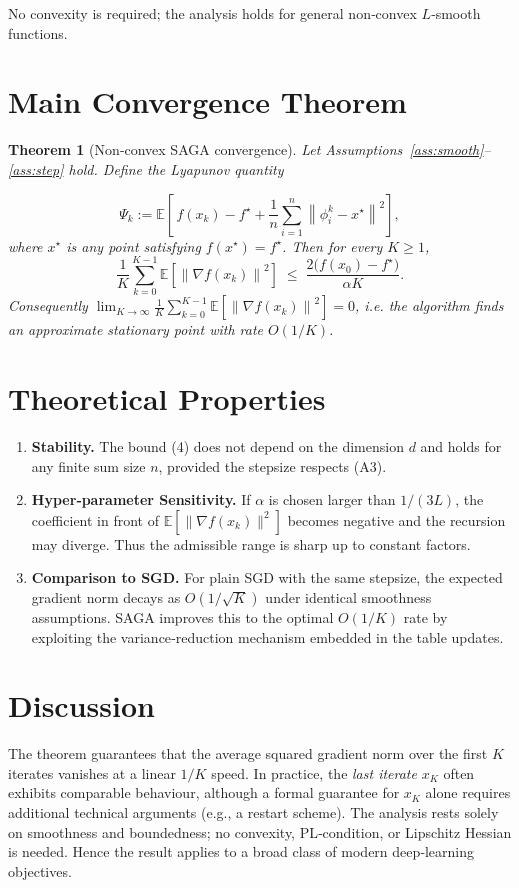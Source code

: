 \documentclass{article}
\newtheorem{theorem}{Theorem}
\newcommand{\E}{\mathbb{E}}
\newcommand{\norm}[1]{\left\|#1\right\|}
\begin{document}
No convexity is required; the analysis holds for general non‑convex $L$‑smooth
functions.

\section*{Main Convergence Theorem}
\begin{theorem}[Non‑convex SAGA convergence]\label{thm:main}
Let Assumptions~\ref{ass:smooth}–\ref{ass:step} hold.
Define the Lyapunov quantity  

\[
\Psi_k:=\E\!\left[\,f(x_k)-f^{\star}
      +\frac{1}{n}\sum_{i=1}^{n}\norm{\phi_i^{k}-x^{\star}}^{2}\right],
\]
where $x^{\star}$ is any point satisfying $f(x^{\star})=f^{\star}$.
Then for every $K\ge1$,
\[
\frac{1}{K}\sum_{k=0}^{K-1}\E\!\left[\norm{\nabla f(x_k)}^{2}\right]
\;\le\;
\frac{2\bigl(f(x_0)-f^{\star}\bigr)}{\alpha K}.
\tag{4}
\]
Consequently $\displaystyle\lim_{K\to\infty}
\frac{1}{K}\sum_{k=0}^{K-1}\E\!\left[\norm{\nabla f(x_k)}^{2}\right]=0$,
i.e. the algorithm finds an \emph{approximate stationary point}
with rate $O(1/K)$.
\end{theorem}

\section*{Theoretical Properties}
\begin{enumerate}[label=\arabic*. ,leftmargin=*]
\item \textbf{Stability.}
The bound (4) does not depend on the dimension $d$ and holds for any
finite sum size $n$, provided the stepsize respects (A3).  

\item \textbf{Hyper‑parameter Sensitivity.}
If $\alpha$ is chosen larger than $1/(3L)$, the coefficient in front of
$\E[\|\nabla f(x_k)\|^{2}]$ becomes negative and the recursion may diverge.
Thus the admissible range is sharp up to constant factors.  

\item \textbf{Comparison to SGD.}
For plain SGD with the same stepsize, the expected gradient norm decays
as $O(1/\sqrt{K})$ under identical smoothness assumptions.
SAGA improves this to the optimal $O(1/K)$ rate by exploiting the
variance‑reduction mechanism embedded in the table updates.
\end{enumerate}

\section*{Discussion}
The theorem guarantees that the average squared gradient norm over the
first $K$ iterates vanishes at a linear $1/K$ speed.  In practice,
the \emph{last iterate} $x_K$ often exhibits comparable behaviour,
 although a formal guarantee for $x_K$ alone requires additional
technical arguments (e.g., a restart scheme).  The analysis rests
solely on smoothness and boundedness; no convexity, PL‑condition, or
Lipschitz Hessian is needed.  Hence the result applies to a broad class
of modern deep‑learning objectives.
\end{document}
